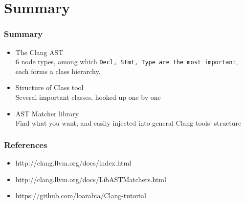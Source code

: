 \documentclass[]{beamer}
\begin{document}
\section{Summary}
\frame{\tableofcontents[currentsection]}
\begin{frame}
  \frametitle{Summary}
  \begin{itemize}
    \item<1-> The Clang AST\\
      6 node types, among which \texttt{Decl, Stmt, Type are the most important},
      each forms a class hierarchy.
    \item<2-> Structure of Class tool\\
      Several important classes, hooked up one by one
    \item<3-> AST Matcher library\\
      Find what you want, and easily injected into general Clang tools' structure
  \end{itemize}
\end{frame}

\begin{frame}
  \frametitle{References}
  \begin{itemize}
    \item http://clang.llvm.org/docs/index.html
    \item http://clang.llvm.org/docs/LibASTMatchers.html
    \item https://github.com/loarabia/Clang-tutorial
  \end{itemize}
\end{frame}

\end{document}
